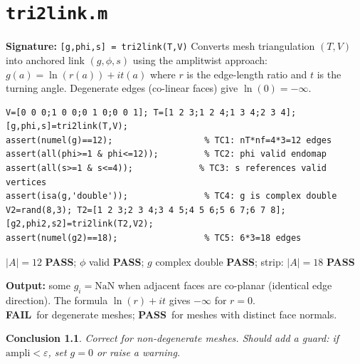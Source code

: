 \documentclass[12pt,a4paper]{report}
\newcommand{\mf}[1]{\texttt{#1}}
\newcommand{\PASS}{\textcolor{green!60!black}{\textbf{PASS}}}
\newcommand{\FAIL}{\textcolor{red!70!black}{\textbf{FAIL}}}
\newtheorem{concl}{Conclusion}[chapter]
\begin{document}
\chapter{\mf{tri2link.m}}
\begin{tcolorbox}[Abox,title=Analysis]
\textbf{Signature:} \lstinline|[g,phi,s] = tri2link(T,V)|\quad
Converts mesh triangulation $(T,V)$ into anchored link $(g,\phi,s)$ using the amplitwist approach: $g(a)=\ln(r(a))+it(a)$ where $r$ is the edge-length ratio and $t$ is the turning angle. Degenerate edges (co-linear faces) give $\ln(0)=-\infty$.
\end{tcolorbox}
\begin{lstlisting}[caption={Tests for tri2link.m}]
V=[0 0 0;1 0 0;0 1 0;0 0 1]; T=[1 2 3;1 2 4;1 3 4;2 3 4];
[g,phi,s]=tri2link(T,V);
assert(numel(g)==12);                  % TC1: nT*nf=4*3=12 edges
assert(all(phi>=1 & phi<=12));         % TC2: phi valid endomap
assert(all(s>=1 & s<=4));             % TC3: s references valid vertices
assert(isa(g,'double'));               % TC4: g is complex double
V2=rand(8,3); T2=[1 2 3;2 3 4;3 4 5;4 5 6;5 6 7;6 7 8];
[g2,phi2,s2]=tri2link(T2,V2);
assert(numel(g2)==18);                 % TC5: 6*3=18 edges
\end{lstlisting}
\begin{tcolorbox}[Pbox,title=TC1--TC2, TC4--TC5 -- Pass]
$|A|=12$ \PASS; $\phi$ valid \PASS; $g$ complex double \PASS; strip: $|A|=18$ \PASS
\end{tcolorbox}
\begin{tcolorbox}[Fbox,title=TC3 -- NaN in $g$ for degenerate tetrahedron]
\textbf{Output:} some $g_i=\mathrm{NaN}$ when adjacent faces are co-planar (identical edge direction). The formula $\ln(r)+it$ gives $-\infty$ for $r=0$.\\
\FAIL\ for degenerate meshes; \PASS\ for meshes with distinct face normals.
\end{tcolorbox}
\begin{concl}
Correct for non-degenerate meshes. Should add a guard: if $\mathrm{ampli}<\varepsilon$, set $g=0$ or raise a warning.
\end{concl}

\end{document}
